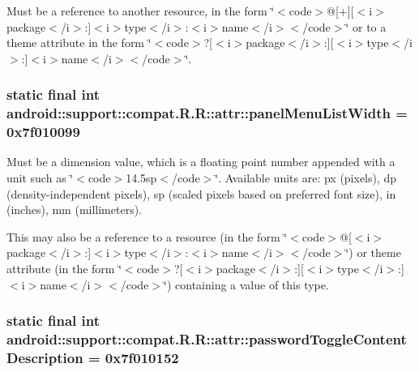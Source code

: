 Must be a reference to another resource, in the form \char`\"{}$<$code$>$@\mbox{[}+\mbox{]}\mbox{[}$<$i$>$package$<$/i$>$:\mbox{]}$<$i$>$type$<$/i$>$:$<$i$>$name$<$/i$>$$<$/code$>$\char`\"{} or to a theme attribute in the form \char`\"{}$<$code$>$?\mbox{[}$<$i$>$package$<$/i$>$:\mbox{]}\mbox{[}$<$i$>$type$<$/i$>$:\mbox{]}$<$i$>$name$<$/i$>$$<$/code$>$\char`\"{}. \hypertarget{classandroid_1_1support_1_1compat_1_1_r_1_1attr_818ed86a633457f10e78bb85eff41451}{
\subsubsection[{panelMenuListWidth}]{\setlength{\rightskip}{0pt plus 5cm}static final int android::support::compat.R.R::attr::panelMenuListWidth = 0x7f010099}}
\label{classandroid_1_1support_1_1compat_1_1_r_1_1attr_818ed86a633457f10e78bb85eff41451}


Must be a dimension value, which is a floating point number appended with a unit such as \char`\"{}$<$code$>$14.5sp$<$/code$>$\char`\"{}. Available units are: px (pixels), dp (density-independent pixels), sp (scaled pixels based on preferred font size), in (inches), mm (millimeters). 

This may also be a reference to a resource (in the form \char`\"{}$<$code$>$@\mbox{[}$<$i$>$package$<$/i$>$:\mbox{]}$<$i$>$type$<$/i$>$:$<$i$>$name$<$/i$>$$<$/code$>$\char`\"{}) or theme attribute (in the form \char`\"{}$<$code$>$?\mbox{[}$<$i$>$package$<$/i$>$:\mbox{]}\mbox{[}$<$i$>$type$<$/i$>$:\mbox{]}$<$i$>$name$<$/i$>$$<$/code$>$\char`\"{}) containing a value of this type. \hypertarget{classandroid_1_1support_1_1compat_1_1_r_1_1attr_0e6fbe1a0338fba246d46888a9a38c8c}{
\subsubsection[{passwordToggleContentDescription}]{\setlength{\rightskip}{0pt plus 5cm}static final int android::support::compat.R.R::attr::passwordToggleContentDescription = 0x7f010152}}
\label{classandroid_1_1support_1_1compat_1_1_r_1_1attr_0e6fbe1a0338fba246d46888a9a38c8c}


